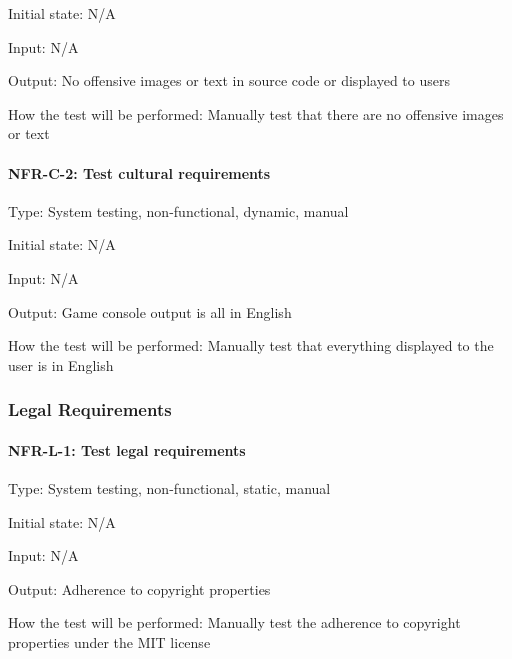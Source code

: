 \documentclass[12pt, titlepage]{article}
\begin{document}
Initial state: N/A

Input: N/A

Output: No offensive images or text in source code or displayed to users

How the test will be performed: Manually test that there are no offensive images or text

\paragraph{NFR-C-2: Test cultural requirements\\}

Type: System testing, non-functional, dynamic, manual

Initial state: N/A

Input: N/A

Output: Game console output is all in English

How the test will be performed: Manually test that everything displayed to the user is in English

\subsubsection{Legal Requirements}

\paragraph{NFR-L-1: Test legal requirements\\}

Type: System testing, non-functional, static, manual

Initial state: N/A

Input: N/A

Output: Adherence to copyright properties

How the test will be performed: Manually test the adherence to copyright properties under the MIT license
\end{document}

